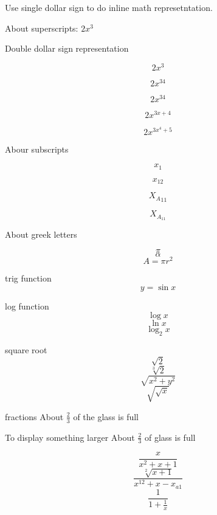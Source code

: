 \documentclass[11pt]{article}
\begin{document}
Use single dollar sign to do inline math represetntation.

About superscripts: $2x^3$

Double dollar sign representation

$$2x^3$$

$$2x^34$$

$$2x^{34}$$

$$2x^{3x+4}$$

$$2x^{3x^4+5}$$

Abour subscripts

$$x_1$$

$$x_{12}$$

$${X_A}_{11}$$

$$X_{A_{11}}$$

About greek letters

$$\pi$$
$$\alpha$$
$$A=\pi r^2$$

trig function
$$y=\sin{x}$$

log function
$$\log{x}$$
$$\ln{x}$$
$$\log_2{x}$$

square root
$$\sqrt{2}$$
$$\sqrt[3]{2}$$
$$\sqrt{x^2+y^2}$$
$$\sqrt{\sqrt{x}}$$

fractions
About $\frac{2}{3}$ of the glass is full

To display something larger
About $\displaystyle{\frac{2}{3}}$ of glass is full

$$\frac{x}{x^2+x+1}$$
$$\frac{\sqrt[2]{x+1}}{x^{12}+x-x_{a1}}$$
$$\frac{1}{1+\frac{1}{x}}$$
\end{document}
